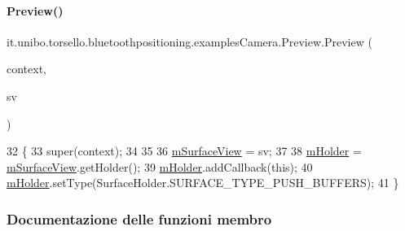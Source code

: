 \paragraph{\texorpdfstring{Preview()}{Preview()}}
{\footnotesize\ttfamily it.\+unibo.\+torsello.\+bluetoothpositioning.\+examples\+Camera.\+Preview.\+Preview (\begin{DoxyParamCaption}\item[{Context}]{context,  }\item[{Surface\+View}]{sv }\end{DoxyParamCaption})\hspace{0.3cm}{\ttfamily [package]}}


\begin{DoxyCode}
32                                              \{
33         super(context);
34 
35 
36         \hyperlink{classit_1_1unibo_1_1torsello_1_1bluetoothpositioning_1_1examplesCamera_1_1Preview_ab263548281e75df6638ae313628fa44f_ab263548281e75df6638ae313628fa44f}{mSurfaceView} = sv;
37 
38         \hyperlink{classit_1_1unibo_1_1torsello_1_1bluetoothpositioning_1_1examplesCamera_1_1Preview_a2eed693c06e3775f459852371eee7af5_a2eed693c06e3775f459852371eee7af5}{mHolder} = \hyperlink{classit_1_1unibo_1_1torsello_1_1bluetoothpositioning_1_1examplesCamera_1_1Preview_ab263548281e75df6638ae313628fa44f_ab263548281e75df6638ae313628fa44f}{mSurfaceView}.getHolder();
39         \hyperlink{classit_1_1unibo_1_1torsello_1_1bluetoothpositioning_1_1examplesCamera_1_1Preview_a2eed693c06e3775f459852371eee7af5_a2eed693c06e3775f459852371eee7af5}{mHolder}.addCallback(\textcolor{keyword}{this});
40         \hyperlink{classit_1_1unibo_1_1torsello_1_1bluetoothpositioning_1_1examplesCamera_1_1Preview_a2eed693c06e3775f459852371eee7af5_a2eed693c06e3775f459852371eee7af5}{mHolder}.setType(SurfaceHolder.SURFACE\_TYPE\_PUSH\_BUFFERS);
41     \}
\end{DoxyCode}


\subsubsection{Documentazione delle funzioni membro}
\hypertarget{classit_1_1unibo_1_1torsello_1_1bluetoothpositioning_1_1examplesCamera_1_1Preview_a8bc995f4776255800f64dfb94d38e47d_a8bc995f4776255800f64dfb94d38e47d}{}\label{classit_1_1unibo_1_1torsello_1_1bluetoothpositioning_1_1examplesCamera_1_1Preview_a8bc995f4776255800f64dfb94d38e47d_a8bc995f4776255800f64dfb94d38e47d} 

